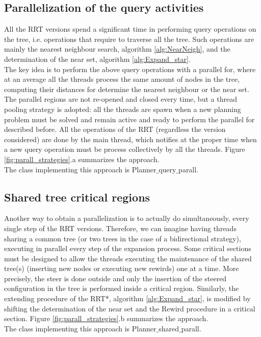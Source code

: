 \subsection{Parallelization of the query activities}

All the RRT versions spend a significant time in performing query operations on the tree, i.e. operations that require to traverse all the tree.
Such operations are mainly the nearest neighbour search, algorithm \ref{alg:NearNeigh}, and the determination of the near set, algorithm \ref{alg:Expand_star}.
\\
The key idea is to perform the above query operations with a parallel for, where at an average all the threads process the same amount of nodes in the tree, computing their distances for determine the nearest neighbour or the near set. 
The parallel regions are not re-opened and closed every time, but a thread pooling strategy is adopted: all the threads are spawn when a new planning problem must be solved and remain active and ready to perform the parallel for described before.
All the operations of the RRT (regardless the version considered) are done by the main thread, which notifies at the proper time when a new query operation must be process collectively by all the threads. Figure \ref{fig:parall_strategies}.a summarizes the approach.
\\
The class implementing this approach is Planner$\_$query$\_$parall.

\subsection{Shared tree critical regions}

Another way to obtain a parallelization is to actually do simultaneously, every single step of the RRT versions. Therefore, we can imagine having threads sharing a common tree (or two trees in the case of a bidirectional strategy), executing in parallel every step of the expansion process. Some critical sections must be designed to allow the threads executing the maintenance of the shared tree(s) (inserting new nodes or executing new rewirds) one at a time.
More precisely, the steer is done outside and only the insertion of the steered configuration in the tree is performed inside a critical region.
Similarly, the extending procedure of the RRT*, algorithm \ref{alg:Expand_star}, is modified by shifting the determination of the near set and the Rewird procedure in a critical section. Figure \ref{fig:parall_strategies}.b summarizes the approach.
\\
The class implementing this approach is Planner$\_$shared$\_$parall.


